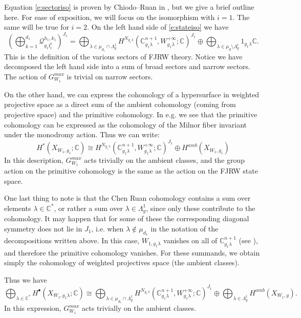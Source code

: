 \documentclass[10pt, letterpaper]{amsart}
\theoremstyle{remark}
\newcommand{\CC}{\mathbb C}
\newcommand{\sQ}{\mathscr{Q}}
\newcommand{\jw}{\mathfrak{j}}
\begin{document}
Equation \eqref{e:sectoriso} is proven by Chiodo--Ruan in \cite{ChR}, but we give a brief outline here. For ease of exposition, we will focus on the isomorphism with $i=1$. The same will be true for $i=2$. On the left hand side of \eqref{e:stateiso} we have 
\begin{equation}\label{e:FJRWsummand}
\left(\bigoplus_{k=1}^{d_1}\sQ_{g_1\jw_1^k}^{h_1,k_1}\right)^{J_1}=\bigoplus_{\lambda\in\mu_{d_1}\cap\Lambda^1_{g}}H^{N_{g_1\lambda}}(\CC^{n+1}_{g_1\lambda}, W^{+\infty}_{g_1\lambda};\CC)^{J_1}\oplus\bigoplus_{\lambda\in\mu_d\setminus\Lambda^1_g}1_{g_1\lambda}\CC.
\end{equation}
This is the definition of the various sectors of FJRW theory. Notice we have decomposed the left hand side into a sum of broad sectors and narrow sectors. The action of $G_{W_1}^{max}$ is trivial on narrow sectors. 

On the other hand, we can express the cohomology of a hypersurface in weighted projective space as a direct sum of the ambient cohomology (coming from projective space) and the primitive cohomology. In e.g. \cite{ChR} we see that the primitive cohomology can be expressed as the cohomology of the Milnor fiber invariant under the monodromy action. Thus we can write:
\[
H^{*}(X_{W_1,g_1};\CC)\cong H^{N_{g_1\lambda}}(\CC^{n+1}_{g_1\lambda}, W^{+\infty}_{g_1\lambda};\CC)^{J_1}\oplus H^{amb}(X_{W_1,g_1})
\]
In this description, $G_{W_1}^{max}$ acts trivially on the ambient classes, and the group action on the primitive cohomology is the same as the action on the FJRW state space. 

One last thing to note is that the Chen Ruan cohomology contains a sum over elements $\lambda\in \CC^*$, or rather a sum over $\lambda\in \Lambda^1_g$, since only these contribute to the cohomology. It may happen that for some of these the corresponding diagonal symmetry does not lie in $J_1$, i.e. when $\lambda\notin\mu_{d_1}$ in the notation of the decompositions written above. In this case, $W_{1,g_1\lambda}$ vanishes on all of $\CC^{n+1}_{g_1\lambda}$ (see \cite[Theorem ??]{ChR}), and therefore the primitive cohomology vanishes. For these summands, we obtain simply the cohomology of weighted projectives space (the ambient classes). 

Thus we have 
\begin{equation}\label{e:CRsummand}
\bigoplus_{\lambda\in \CC^*}H^{\bullet}(X_{W_1,g_1\lambda};\CC)\cong\bigoplus_{\lambda\in\mu_{d_1}\cap\Lambda^1_{g}} H^{N_{g_1\lambda}}(\CC^{n+1}_{g_1\lambda}, W^{+\infty}_{g_1\lambda};\CC)^{J_1}\oplus \bigoplus_{\lambda\in\Lambda^1_{g}}H^{amb}(X_{W_1,g}).
\end{equation}
In this expression, $G_{W_1}^{max}$ acts trivially on the ambient classes. 
\end{document}
